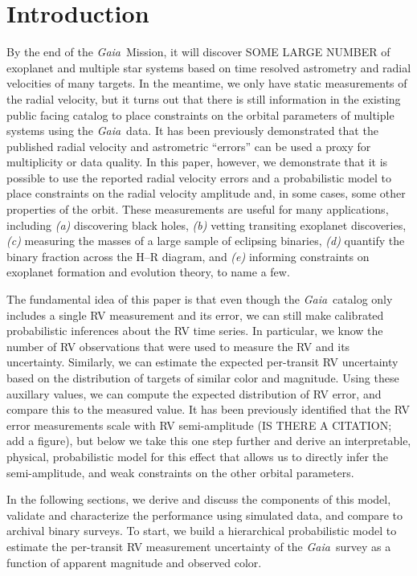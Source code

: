 \documentclass[modern, letterpaper]{aastex63}
\newcommand{\project}[1]{\textsl{#1}}
\newcommand{\Gaia}{\project{Gaia}}
\begin{document}

\section{Introduction} \label{sec:intro}

By the end of the \Gaia\ Mission, it will discover SOME LARGE NUMBER of exoplanet and multiple star systems based on time resolved astrometry and radial velocities of many targets.
In the meantime, we only have static measurements of the radial velocity, but it turns out that there is still information in the existing public facing catalog to place constraints on the orbital parameters of multiple systems using the \Gaia\ data.
It has been previously demonstrated that the published radial velocity and astrometric ``errors'' can be used a proxy for multiplicity or data quality.
In this paper, however, we demonstrate that it is possible to use the reported radial velocity errors and a probabilistic model to place constraints on the radial velocity amplitude and, in some cases, some other properties of the orbit.
These measurements are useful for many applications, including \emph{(a)} discovering black holes, \emph{(b)} vetting transiting exoplanet discoveries, \emph{(c)} measuring the masses of a large sample of eclipsing binaries, \emph{(d)} quantify the binary fraction across the H--R diagram, and \emph{(e)} informing constraints on exoplanet formation and evolution theory, to name a few.

The fundamental idea of this paper is that even though the \Gaia\ catalog only includes a single RV measurement and its error, we can still make calibrated probabilistic inferences about the RV time series.
In particular, we know the number of RV observations that were used to measure the RV and its uncertainty.
Similarly, we can estimate the expected per-transit RV uncertainty based on the distribution of targets of similar color and magnitude.
Using these auxillary values, we can compute the expected distribution of RV error, and compare this to the measured value.
It has been previously identified that the RV error measurements scale with RV semi-amplitude (IS THERE A CITATION; add a figure), but below we take this one step further and derive an interpretable, physical, probabilistic model for this effect that allows us to directly infer the semi-amplitude, and weak constraints on the other orbital parameters.

In the following sections, we derive and discuss the components of this model, validate and characterize the performance using simulated data, and compare to archival binary surveys.
To start, we build a hierarchical probabilistic model to estimate the per-transit RV measurement uncertainty of the \Gaia\ survey as a function of apparent magnitude and observed color.
\end{document}
